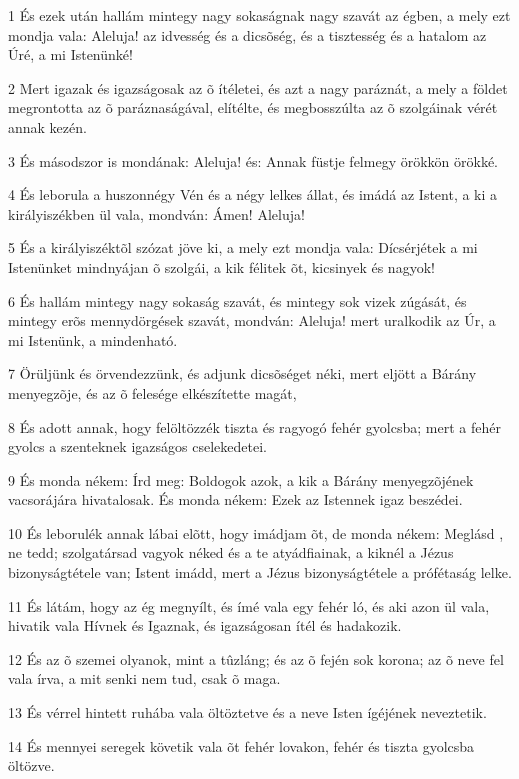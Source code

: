 \par 1 És ezek után hallám mintegy nagy sokaságnak nagy szavát az égben, a mely ezt mondja vala: Aleluja! az idvesség és a dicsõség, és a tisztesség és a hatalom az Úré, a mi Istenünké!
\par 2 Mert igazak és igazságosak az õ ítéletei, és azt a nagy paráznát, a mely a földet megrontotta az õ paráznaságával, elítélte, és megbosszúlta  az õ szolgáinak vérét annak kezén.
\par 3 És másodszor is mondának: Aleluja! és: Annak füstje felmegy örökkön örökké.
\par 4 És leborula a huszonnégy Vén és a négy lelkes állat,  és imádá az Istent, a ki a királyiszékben ül vala, mondván: Ámen! Aleluja!
\par 5 És a királyiszéktõl szózat jöve ki, a mely ezt mondja vala: Dícsérjétek a mi Istenünket mindnyájan õ szolgái, a kik félitek õt, kicsinyek és nagyok!
\par 6 És hallám mintegy nagy sokaság szavát, és mintegy sok vizek zúgását, és mintegy erõs mennydörgések szavát, mondván: Aleluja! mert uralkodik az Úr, a mi Istenünk, a mindenható.
\par 7 Örüljünk és örvendezzünk, és adjunk dicsõséget néki, mert eljött a Bárány menyegzõje, és az õ felesége elkészítette magát,
\par 8 És adott annak, hogy felöltözzék tiszta és ragyogó fehér gyolcsba; mert a fehér gyolcs a szenteknek igazságos cselekedetei.
\par 9 És monda nékem: Írd meg: Boldogok azok, a kik a Bárány menyegzõjének vacsorájára hivatalosak. És monda nékem: Ezek az Istennek igaz beszédei.
\par 10 És leborulék annak lábai elõtt, hogy imádjam õt, de monda nékem: Meglásd , ne tedd; szolgatársad vagyok néked és a te atyádfiainak, a kiknél a Jézus bizonyságtétele  van; Istent imádd, mert a Jézus bizonyságtétele a prófétaság lelke.
\par 11 És látám, hogy az ég megnyílt, és ímé vala egy fehér ló, és aki azon ül vala, hivatik vala  Hívnek és Igaznak, és igazságosan ítél és hadakozik.
\par 12 És az õ szemei olyanok, mint a tûzláng; és az õ fején sok korona; az õ neve fel vala írva, a mit senki nem tud, csak õ maga.
\par 13 És vérrel hintett ruhába vala öltöztetve és a neve Isten ígéjének  neveztetik.
\par 14 És mennyei seregek követik vala õt fehér lovakon, fehér és tiszta gyolcsba öltözve.
